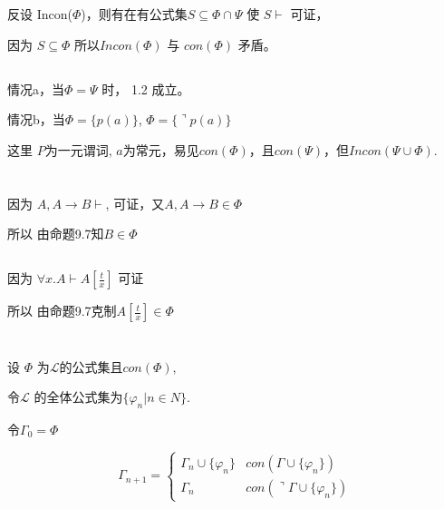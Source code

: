 \documentclass{article}
\begin{document}
\begin{CJK*}{UTF8}{gbsn}

\section{}

\subsection{}

反设 Incon($\Phi$)，则有在有公式集$S \subseteq \Phi \cap \Psi$ 使 $S \vdash$ 可证， 

因为 $S \subseteq \Phi $ 所以$In con(\Phi)$ 与 $con (\Phi)$ 矛盾。


\subsection{}
情况a，当$\Phi = \Psi$ 时， 1.2 成立。

情况b，当$\Phi = \{ p(a)\}$, $\Phi = \{ \urcorner p(a) \}$

这里 $P $为一元谓词, $a$为常元，易见$con ({\Phi})$，且$con ({\Psi})$，但$Incon (\Psi \cup \Phi)$.
\section{}
\subsection{}
因为 $A , A \rightarrow B \vdash$, 可证，又$A,A\rightarrow B \in \Phi$

所以 由命题9.7知$B \in \Phi$

\subsection{}
因为 $\forall x. A \vdash A [\frac{t}{x}]$ 可证

所以 由命题9.7克制$A [\frac{t}{x}]\in \Phi$

\section{}
设 $\Phi$ 为$\mathcal{L}$的公式集且$con(\Phi)$,

令$\mathcal{L}$ 的全体公式集为$\{\varphi_n | n \in N\}$.

令$\Gamma_0 = \Phi$

\begin{equation*}
\Gamma_{n+1} = \left\{ {\begin{array}{*{20}{c}}
{\Gamma_n \cup \{\varphi_n\}}&{con (\Gamma\cup \{\varphi_n\})}\\
\Gamma_n&{con ( \urcorner \Gamma\cup \{\varphi_n\})}
\end{array}} \right.
\end{equation*}


\end{CJK*}
\end{document}
